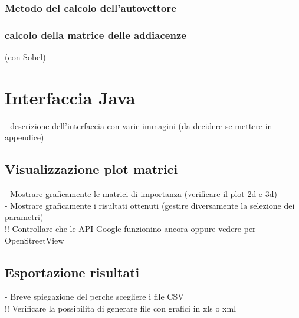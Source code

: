 \subsubsection{Metodo del calcolo dell'autovettore}


\subsubsection{calcolo della matrice delle addiacenze}
 (con Sobel)

\section{Interfaccia Java}
- descrizione dell'interfaccia con varie immagini (da decidere se mettere in appendice)\\
\subsection{Visualizzazione plot matrici}
- Mostrare graficamente le matrici di importanza (verificare il plot 2d e 3d)\\
- Mostrare graficamente i risultati ottenuti (gestire diversamente la selezione dei parametri)\\
!! Controllare che le API Google funzionino ancora oppure vedere per OpenStreetView\\
\subsection{Esportazione risultati}
- Breve spiegazione del perche scegliere i file CSV\\
!! Verificare la possibilita di generare file con grafici in xls o xml\\
